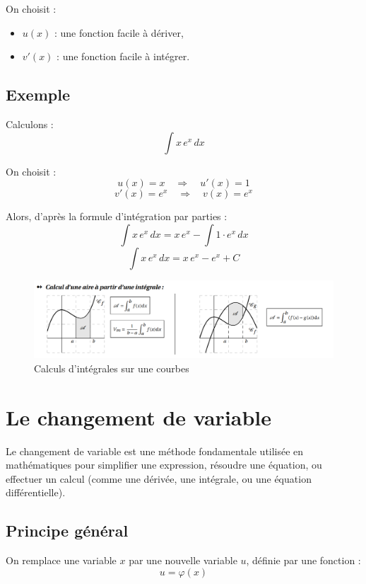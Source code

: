 \documentclass[12]{article}%
\theoremstyle{plain}
\theoremstyle{definition}
\theoremstyle{remark}
\begin{document}
On choisit :
\begin{itemize}
	\item \( u(x) \) : une fonction facile à dériver,
	\item \( v'(x) \) : une fonction facile à intégrer.
\end{itemize}

\subsection*{Exemple}

Calculons :
\[
\int x\,e^x\,dx
\]

On choisit :
\[
u(x) = x \quad \Rightarrow \quad u'(x) = 1
\]
\[
v'(x) = e^x \quad \Rightarrow \quad v(x) = e^x
\]

Alors, d'après la formule d'intégration par parties :
\[
\int x\,e^x\,dx = x\,e^x - \int 1 \cdot e^x\,dx
\]
\[
\int x\,e^x\,dx = x\,e^x - e^x + C
\]


\begin{figure}[h] %
	\centering
	\includegraphics[width=1\textwidth]{./images/integrale.png} %
	\caption{Calculs d'intégrales sur une courbes}
	\label{fig:integrale} %
\end{figure}


\newpage
\section{Le changement de variable}

Le changement de variable est une méthode fondamentale utilisée en mathématiques pour simplifier une expression, résoudre une équation, ou effectuer un calcul (comme une dérivée, une intégrale, ou une équation différentielle).

\subsection*{Principe général}

On remplace une variable \( x \) par une nouvelle variable \( u \), définie par une fonction :
\[
u = \varphi(x)
\]
\end{document}
